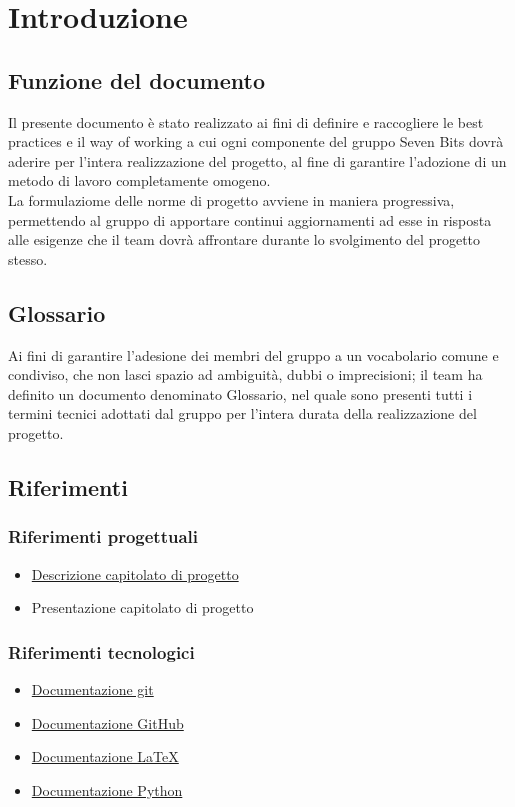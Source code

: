 \section{Introduzione}
    \subsection{Funzione del documento}
    Il presente documento è stato realizzato ai fini di definire e raccogliere le best 
    practices e il way of working a cui ogni componente del gruppo Seven Bits dovrà
    aderire per l'intera realizzazione del progetto, al fine di garantire l'adozione 
    di un metodo di lavoro completamente omogeno.\\
    La formulaziome delle norme di progetto avviene in maniera progressiva, permettendo
    al gruppo di apportare continui aggiornamenti ad esse in risposta alle esigenze che
    il team dovrà affrontare durante lo svolgimento del progetto stesso.\\ 

    \subsection{Glossario}
    Ai fini di garantire l'adesione dei membri del gruppo a un vocabolario comune 
    e condiviso, che non lasci spazio ad ambiguità, dubbi o imprecisioni; il team ha definito
    un documento denominato Glossario, nel quale sono presenti tutti i termini tecnici adottati
    dal gruppo per l'intera durata della realizzazione del progetto.

    \subsection{Riferimenti}
        \subsubsection{Riferimenti progettuali}
        \begin{itemize}
            \item \href{https://www.math.unipd.it/~tullio/IS-1/2024/Progetto/C4.pdf}{Descrizione capitolato di progetto}
            \item Presentazione capitolato di progetto 
        \end{itemize}
        \subsubsection{Riferimenti tecnologici}
        \begin{itemize}
            \item \href{https://git-scm.com/docs}{Documentazione git}
            \item \href{https://docs.github.com/en}{Documentazione GitHub}
            \item \href{https://www.latex-project.org/help/documentation/}{Documentazione LaTeX}
            \item \href{https://www.python.org/doc/}{Documentazione Python}
        \end{itemize}